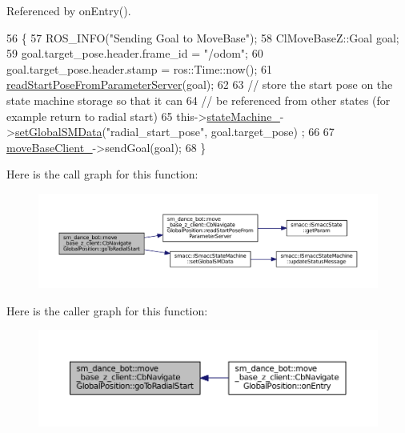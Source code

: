Referenced by on\+Entry().


\begin{DoxyCode}
56   \{
57     ROS\_INFO(\textcolor{stringliteral}{"Sending Goal to MoveBase"});
58     ClMoveBaseZ::Goal goal;
59     goal.target\_pose.header.frame\_id = \textcolor{stringliteral}{"/odom"};
60     goal.target\_pose.header.stamp = ros::Time::now();
61     \hyperlink{classsm__dance__bot_1_1move__base__z__client_1_1CbNavigateGlobalPosition_ad936dff37e9ca4d5ba0fb602ada6671e}{readStartPoseFromParameterServer}(goal);
62 
63     \textcolor{comment}{// store the start pose on the state machine storage so that it can}
64     \textcolor{comment}{// be referenced from other states (for example return to radial start)}
65     this->\hyperlink{classsmacc_1_1SmaccClientBehavior_a7950b5684d6de0a8e8959c0936ce9a19}{stateMachine\_}->\hyperlink{classsmacc_1_1ISmaccStateMachine_a8588f9e580fbb95b53e2bd2ca3ff1f98}{setGlobalSMData}(\textcolor{stringliteral}{"radial\_start\_pose"}, goal.target\_pose)
      ;
66 
67     \hyperlink{classsm__dance__bot_1_1move__base__z__client_1_1CbNavigateGlobalPosition_a301398c07738d6680e163782d35365c5}{moveBaseClient\_}->sendGoal(goal);
68   \}
\end{DoxyCode}


Here is the call graph for this function\+:
\nopagebreak
\begin{figure}[H]
\begin{center}
\leavevmode
\includegraphics[width=350pt]{classsm__dance__bot_1_1move__base__z__client_1_1CbNavigateGlobalPosition_aa7e91d17625df52b94bb29a9cd1ae7e5_cgraph}
\end{center}
\end{figure}




Here is the caller graph for this function\+:
\nopagebreak
\begin{figure}[H]
\begin{center}
\leavevmode
\includegraphics[width=350pt]{classsm__dance__bot_1_1move__base__z__client_1_1CbNavigateGlobalPosition_aa7e91d17625df52b94bb29a9cd1ae7e5_icgraph}
\end{center}
\end{figure}


